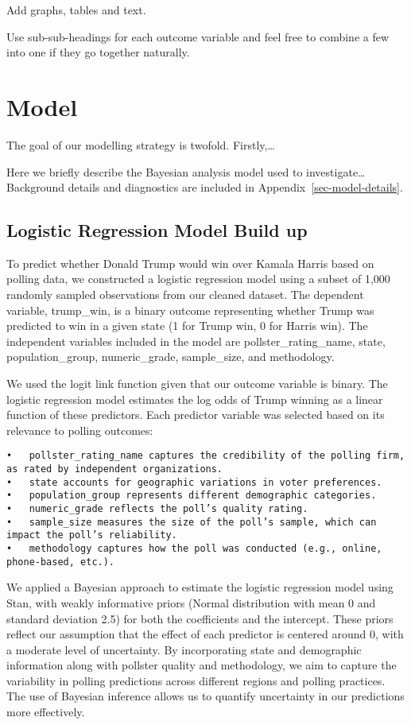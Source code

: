 \documentclass[
  letterpaper,
  DIV=11,
  numbers=noendperiod]{scrartcl}
\begin{document}
Add graphs, tables and text.

Use sub-sub-headings for each outcome variable and feel free to combine
a few into one if they go together naturally.

\section{Model}\label{model}

The goal of our modelling strategy is twofold. Firstly,\ldots{}

Here we briefly describe the Bayesian analysis model used to
investigate\ldots{} Background details and diagnostics are included in
Appendix~\ref{sec-model-details}.

\subsection{Logistic Regression Model Build
up}\label{logistic-regression-model-build-up}

To predict whether Donald Trump would win over Kamala Harris based on
polling data, we constructed a logistic regression model using a subset
of 1,000 randomly sampled observations from our cleaned dataset. The
dependent variable, trump\_win, is a binary outcome representing whether
Trump was predicted to win in a given state (1 for Trump win, 0 for
Harris win). The independent variables included in the model are
pollster\_rating\_name, state, population\_group, numeric\_grade,
sample\_size, and methodology.

We used the logit link function given that our outcome variable is
binary. The logistic regression model estimates the log odds of Trump
winning as a linear function of these predictors. Each predictor
variable was selected based on its relevance to polling outcomes:

\begin{verbatim}
•   pollster_rating_name captures the credibility of the polling firm, as rated by independent organizations.
•   state accounts for geographic variations in voter preferences.
•   population_group represents different demographic categories.
•   numeric_grade reflects the poll’s quality rating.
•   sample_size measures the size of the poll’s sample, which can impact the poll’s reliability.
•   methodology captures how the poll was conducted (e.g., online, phone-based, etc.).
\end{verbatim}

We applied a Bayesian approach to estimate the logistic regression model
using Stan, with weakly informative priors (Normal distribution with
mean 0 and standard deviation 2.5) for both the coefficients and the
intercept. These priors reflect our assumption that the effect of each
predictor is centered around 0, with a moderate level of uncertainty. By
incorporating state and demographic information along with pollster
quality and methodology, we aim to capture the variability in polling
predictions across different regions and polling practices. The use of
Bayesian inference allows us to quantify uncertainty in our predictions
more effectively.
\end{document}
